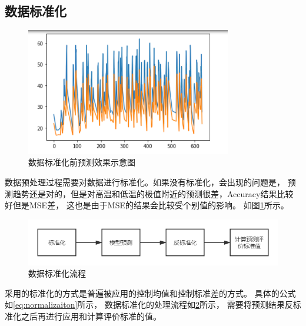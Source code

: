 

  \subsection{数据标准化}
  \begin{figure}
    \centering
    \includegraphics[width=0.8\textwidth]{figures/normalization.png}
    \caption{数据标准化前预测效果示意图}
    \label{fig:before normalization all points}
  \end{figure}
  数据预处理过程需要对数据进行标准化。如果没有标准化，会出现的问题是，
  预测趋势还是对的，但是对高温和低温的极值附近的预测很差，Accuracy结果比较好但是MSE差，
  这也是由于MSE的结果会比较受个别值的影响。
  如图\ref{fig:before normalization all points}所示。


  \begin{figure}
    \centering
    \includegraphics[width=\textwidth]{figures/标准化流程.png}
    \caption{数据标准化流程}
    \label{fig:pipeline of normalization}
  \end{figure}
  
  采用的标准化的方式是普遍被应用的控制均值和控制标准差的方式。
  具体的公式如\ref{eq:normalizaiton}所示，
  数据标准化的处理流程如\ref{fig:pipeline of normalization}所示，
  需要将预测结果反标准化之后再进行应用和计算评价标准的值。

